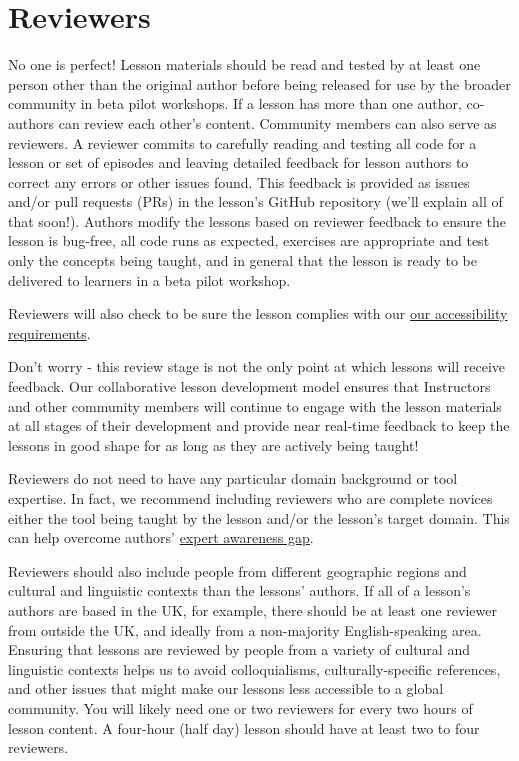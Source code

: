 \documentclass[
]{book}
\begin{document}
\hypertarget{reviewers}{%
\section{Reviewers}\label{reviewers}}

No one is perfect! Lesson materials should be read and tested by at least
one person other than the original author before being released for use by the broader community in beta pilot workshops.
If a lesson has more than one author, co-authors can review each other's content.
Community members can also serve as reviewers. A reviewer commits to carefully
reading and testing all code for a lesson or set of episodes and leaving detailed
feedback for lesson authors to correct any errors or other issues found. This feedback is
provided as issues and/or pull requests (PRs) in the lesson's GitHub repository
(we'll explain all of that soon!). Authors modify the lessons based on reviewer feedback to ensure the
lesson is bug-free, all code runs as expected, exercises are appropriate and test
only the concepts being taught, and in general that the lesson is ready to be
delivered to learners in a beta pilot workshop.

Reviewers will also check to be sure the lesson complies with our
\href{link}{our accessibility requirements}.

Don't worry - this review stage is not the only point at which lessons will
receive feedback. Our collaborative lesson development model ensures that
Instructors and other community members will continue to engage with the lesson
materials at all stages of their development and provide near real-time feedback
to keep the lessons in good shape for as long as they are actively being taught!

Reviewers do not need to have any particular domain background or tool expertise.
In fact, we recommend including reviewers who are complete novices either
the tool being taught by the lesson and/or the lesson's target domain. This can
help overcome authors' \href{https://carpentries.github.io/instructor-training/03-expertise/index.html\#expertise-and-teaching}{expert awareness gap}.

Reviewers should also include people from different geographic regions and
cultural and linguistic contexts than the lessons' authors. If all of
a lesson's authors are based in the UK, for example, there should be at least
one reviewer from outside the UK, and ideally from a non-majority English-speaking
area. Ensuring that lessons are reviewed by people from a variety of cultural and linguistic
contexts helps us to avoid colloquialisms, culturally-specific references, and other issues that might make our lessons less accessible to a global community. You will likely need one or two reviewers for every
two hours of lesson content. A four-hour (half day) lesson should have at least two to four reviewers.
\end{document}
